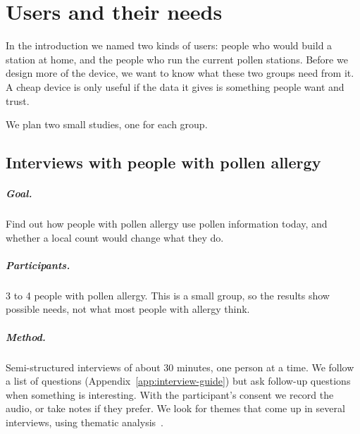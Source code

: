 \chapter{Users and their needs}\label{ch:user-needs}


In the introduction we named two kinds of users: people who would build a station at home, and
the people who run the current pollen stations. Before we design more of the device, we want
to know what these two groups need from it. A cheap device is only useful if the data it gives
is something people want and trust.

We plan two small studies, one for each group.

\section{Interviews with people with pollen allergy}\label{sec:allergy-interviews}


\paragraph{Goal.} Find out how people with pollen allergy use pollen information today, and
whether a local count would change what they do.

\paragraph{Participants.} 3 to 4 people with pollen allergy.
This is a small group, so the results show possible needs, not what most people with allergy
think.

\paragraph{Method.} Semi-structured interviews of about 30 minutes, one person at a time. We
follow a list of questions (Appendix~\ref{app:interview-guide}) but ask follow-up questions when
something is interesting. With the participant's consent we record the audio, or take notes if
they prefer. We look for themes that come up in several interviews, using thematic
analysis~\cite{Braun2006}.

